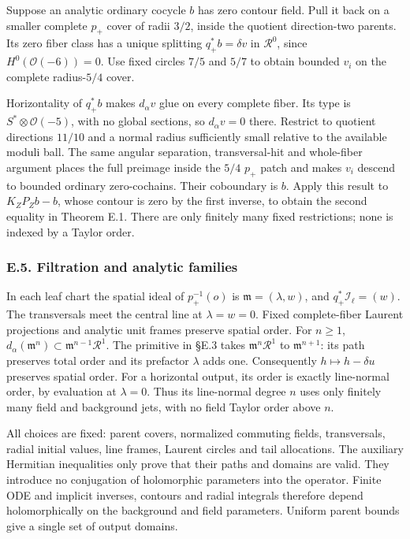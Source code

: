 \documentclass[
  english,
  11pt,
  reqno]{amsart}
\newcounter{none} %
\begin{document}
Suppose an analytic ordinary cocycle \(b\) has zero contour field. Pull
it back on a smaller complete \(p_+\) cover of radii \(3/2\), inside the
quotient direction-two parents. Its zero fiber class has a unique
splitting \(q_+^*b=\delta v\) in \(\mathcal R^0\), since
\(H^0(\mathcal O(-6))=0\). Use fixed circles \(7/5\) and \(5/7\) to
obtain bounded \(v_i\) on the complete radius-\(5/4\) cover.

Horizontality of \(q_+^*b\) makes \(d_\alpha v\) glue on every complete
fiber. Its type is \(S^*\otimes\mathcal O(-5)\), with no global
sections, so \(d_\alpha v=0\) there. Restrict to quotient directions
\(11/10\) and a normal radius sufficiently small relative to the
available moduli ball. The same angular separation, transversal-hit and
whole-fiber argument places the full preimage inside the \(5/4\) \(p_+\)
patch and makes \(v_i\) descend to bounded ordinary zero-cochains. Their
coboundary is \(b\). Apply this result to \(K_ZP_Zb-b\), whose contour
is zero by the first inverse, to obtain the second equality in Theorem
E.1. There are only finitely many fixed restrictions; none is indexed by
a Taylor order.

\protect{}\label{sec:gg-penrose-filtration-and-families}

\subsubsection{E.5. Filtration and analytic
families}\label{e.5.-filtration-and-analytic-families}

In each leaf chart the spatial ideal of \(p_+^{-1}(o)\) is
\(\mathfrak m=(\lambda,w)\), and \(q_+^*\mathcal I_\ell=(w)\). The
transversals meet the central line at \(\lambda=w=0\). Fixed
complete-fiber Laurent projections and analytic unit frames preserve
spatial order. For \(n\ge1\),
\(d_\alpha(\mathfrak m^n)\subset\mathfrak m^{n-1}\mathcal R^1\). The
primitive in §E.3 takes \(\mathfrak m^n\mathcal R^1\) to
\(\mathfrak m^{n+1}\): its path preserves total order and its prefactor
\(\lambda\) adds one. Consequently \(h\mapsto h-\delta u\) preserves
spatial order. For a horizontal output, its order is exactly line-normal
order, by evaluation at \(\lambda=0\). Thus its line-normal degree \(n\)
uses only finitely many field and background jets, with no field Taylor
order above \(n\).

All choices are fixed: parent covers, normalized commuting fields,
transversals, radial initial values, line frames, Laurent circles and
tail allocations. The auxiliary Hermitian inequalities only prove that
their paths and domains are valid. They introduce no conjugation of
holomorphic parameters into the operator. Finite ODE and implicit
inverses, contours and radial integrals therefore depend holomorphically
on the background and field parameters. Uniform parent bounds give a
single set of output domains.
\end{document}
